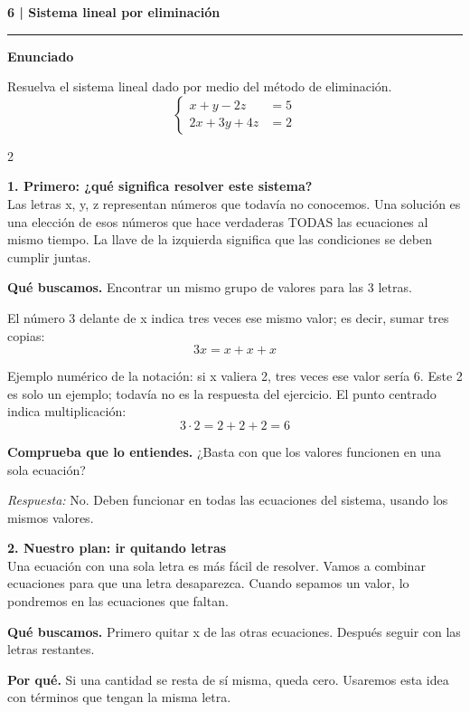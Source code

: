 \documentclass[11pt,a4paper,landscape]{article}
\newcommand{\titulo}[1]{{\LARGE\bfseries #1}\par\smallskip\hrule\medskip}
\begin{document}
\newpage{}\hypertarget{1.1-6}{}
\titulo{6 | Sistema lineal por eliminación}
\textbf{Enunciado}\par Resuelva el sistema lineal dado por medio del método de eliminación.
\[\left\{\begin{aligned}x + y - 2z &= 5\\2x + 3y + 4z &= 2\end{aligned}\right.\]
\begin{multicols*}{2}
\noindent\begin{minipage}{\linewidth}\textbf{1. Primero: ¿qué significa resolver este sistema?}\\[2pt]Las letras x, y, z representan números que todavía no conocemos. Una solución es una elección de esos números que hace verdaderas TODAS las ecuaciones al mismo tiempo. La llave de la izquierda significa que las condiciones se deben cumplir juntas.
\par\smallskip\textbf{Qué buscamos.} Encontrar un mismo grupo de valores para las 3 letras.
\par\smallskip El número 3 delante de x indica tres veces ese mismo valor; es decir, sumar tres copias:
\[3x=x+x+x\]
\par\smallskip Ejemplo numérico de la notación: si x valiera 2, tres veces ese valor sería 6. Este 2 es solo un ejemplo; todavía no es la respuesta del ejercicio. El punto centrado indica multiplicación:
\[3\cdot 2=2+2+2=6\]
\par\smallskip\textbf{Comprueba que lo entiendes.} ¿Basta con que los valores funcionen en una sola ecuación?\par\textit{Respuesta:} No. Deben funcionar en todas las ecuaciones del sistema, usando los mismos valores.
\end{minipage}\par\medskip
\noindent\begin{minipage}{\linewidth}\textbf{2. Nuestro plan: ir quitando letras}\\[2pt]Una ecuación con una sola letra es más fácil de resolver. Vamos a combinar ecuaciones para que una letra desaparezca. Cuando sepamos un valor, lo pondremos en las ecuaciones que faltan.
\par\smallskip\textbf{Qué buscamos.} Primero quitar x de las otras ecuaciones. Después seguir con las letras restantes.
\par\smallskip\textbf{Por qué.} Si una cantidad se resta de sí misma, queda cero. Usaremos esta idea con términos que tengan la misma letra.

\end{minipage}
\end{multicols*}
\end{document}

